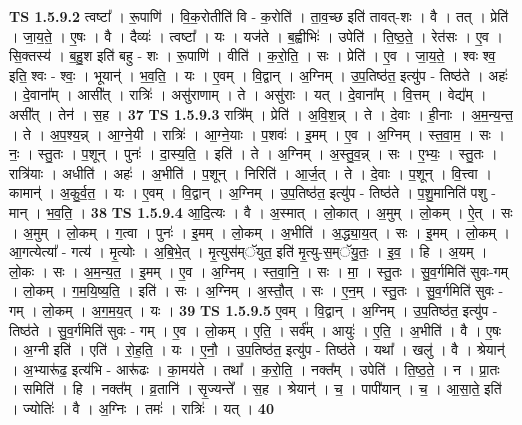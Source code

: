 \documentclass[17pt]{extarticle}
\begin{document}
                  \newline
                                \textbf{ TS 1.5.9.2} \newline
                  त्वष्टा᳚ । रू॒पाणि॑ । वि॒क॒रोतीति॑ वि - क॒रोति॑ । ता॒व॒च्छ इति॑ तावत्-शः । वै । तत् । प्रेति॑ । जा॒य॒ते॒ । ए॒षः । वै । दैव्यः॑ । त्वष्टा᳚ । यः । यज॑ते । ब॒ह्वीभिः॑ । उपेति॑ । ति॒ष्ठ॒ते॒ । रेत॑सः । ए॒व । सि॒क्तस्य॑ । ब॒हु॒श इति॑ बहु - शः । रू॒पाणि॑ । वीति॑ । क॒रो॒ति॒ । सः । प्रेति॑ । ए॒व । जा॒य॒ते॒ । श्वः श्व॒ इति॒ श्वः - श्वः॒ । भूयान्॑ । भ॒व॒ति॒ । यः । ए॒वम् । वि॒द्वान् । अ॒ग्निम् । उ॒प॒तिष्ठ॑त॒ इत्यु॑प - तिष्ठ॑ते । अहः॑ । दे॒वाना᳚म् । आसी᳚त् । रात्रिः॑ । असु॑राणाम् । ते । असु॑राः । यत् । दे॒वाना᳚म् । वि॒त्तम् । वेद्य᳚म् । असी᳚त् । तेन॑ । स॒ह । \textbf{  37} \newline
                  \newline
                                \textbf{ TS 1.5.9.3} \newline
                  रात्रि᳚म् । प्रेति॑ । अ॒वि॒श॒न्न् । ते । दे॒वाः । ही॒नाः । अ॒म॒न्य॒न्त॒ । ते । अ॒प॒श्य॒न्न् । आ॒ग्ने॒यी । रात्रिः॑ । आ॒ग्ने॒याः । प॒शवः॑ । इ॒मम् । ए॒व । अ॒ग्निम् । स्त॒वा॒म॒ । सः । नः॒ । स्तु॒तः । प॒शून् । पुनः॑ । दा॒स्य॒ति॒ । इति॑ । ते । अ॒ग्निम् । अ॒स्तु॒व॒न्न् । सः । ए॒भ्यः॒ । स्तु॒तः । रात्रि॑याः । अधीति॑ । अहः॑ । अ॒भीति॑ । प॒शून् । निरिति॑ । आ॒र्ज॒त् । ते । दे॒वाः । प॒शून् । वि॒त्त्वा । कामान्॑ । अ॒कु॒र्व॒त॒ । यः । ए॒वम् । वि॒द्वान् । अ॒ग्निम् । उ॒प॒तिष्ठ॑त॒ इत्यु॑प - तिष्ठ॑ते । प॒शु॒मानिति॑ पशु - मान् । भ॒व॒ति॒ । \textbf{  38} \newline
                  \newline
                                \textbf{ TS 1.5.9.4} \newline
                  आ॒दि॒त्यः । वै । अ॒स्मात् । लो॒कात् । अ॒मुम् । लो॒कम् । ऐ॒त् । सः । अ॒मुम् । लो॒कम् । ग॒त्वा । पुनः॑ । इ॒मम् । लो॒कम् । अ॒भीति॑ । अ॒द्ध्या॒य॒त् । सः । इ॒मम् । लो॒कम् । आ॒गत्येत्या᳚ - गत्य॑ । मृ॒त्योः । अ॒बि॒भे॒त् । मृ॒त्युस॑म्ॅयुत॒ इति॑ मृ॒त्यु-स॒म्ॅयु॒तः॒ । इ॒व॒ । हि । अ॒यम् । लो॒कः । सः । अ॒म॒न्य॒त॒ । इ॒मम् । ए॒व । अ॒ग्निम् । स्त॒वा॒नि॒ । सः । मा॒ । स्तु॒तः । सु॒व॒र्गमिति॑ सुवः-गम् । लो॒कम् । ग॒म॒यि॒ष्य॒ति॒ । इति॑ । सः । अ॒ग्निम् । अ॒स्तौ॒त् । सः । ए॒न॒म् । स्तु॒तः । सु॒व॒र्गमिति॑ सुवः - गम् । लो॒कम् । अ॒ग॒म॒य॒त् । यः । \textbf{  39} \newline
                  \newline
                                \textbf{ TS 1.5.9.5} \newline
                  ए॒वम् । वि॒द्वान् । अ॒ग्निम् । उ॒प॒तिष्ठ॑त॒ इत्यु॑प - तिष्ठ॑ते । सु॒व॒र्गमिति॑ सुवः - गम् । ए॒व । लो॒कम् । ए॒ति॒ । सर्व᳚म् । आयुः॑ । ए॒ति॒ । अ॒भीति॑ । वै । ए॒षः । अ॒ग्नी इति॑ । एति॑ । रो॒ह॒ति॒ । यः । ए॒नौ॒ । उ॒प॒तिष्ठ॑त॒ इत्यु॑प - तिष्ठ॑ते । यथा᳚ । खलु॑ । वै । श्रेयान्॑ । अ॒भ्यारू॑ढ॒ इत्य॑भि - आरू॑ढः । का॒मय॑ते । तथा᳚ । क॒रो॒ति॒ । नक्त᳚म् । उपेति॑ । ति॒ष्ठ॒ते॒ । न । प्रा॒तः । समिति॑ । हि । नक्त᳚म् । व्र॒तानि॑ । सृ॒ज्यन्ते᳚ । स॒ह । श्रेयान्॑ । च॒ । पापी॑यान् । च॒ । आ॒सा॒ते॒ इति॑ । ज्योतिः॑ । वै । अ॒ग्निः । तमः॑ । रात्रिः॑ । यत् । \textbf{  40} \newline
\end{document}
